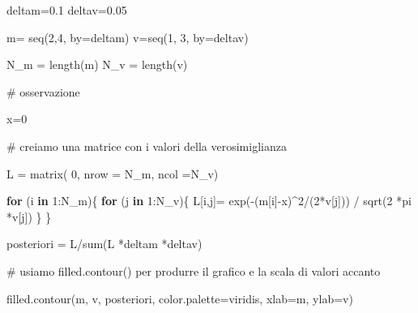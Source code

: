 \documentclass[
  italian,
  letterpaper,
]{book}
\newenvironment{Shaded}{\begin{snugshade}}{\end{snugshade}}
\newcommand{\AttributeTok}[1]{\textcolor[rgb]{0.40,0.45,0.13}{#1}}
\newcommand{\CommentTok}[1]{\textcolor[rgb]{0.37,0.37,0.37}{#1}}
\newcommand{\ControlFlowTok}[1]{\textcolor[rgb]{0.00,0.23,0.31}{\textbf{#1}}}
\newcommand{\DecValTok}[1]{\textcolor[rgb]{0.68,0.00,0.00}{#1}}
\newcommand{\FloatTok}[1]{\textcolor[rgb]{0.68,0.00,0.00}{#1}}
\newcommand{\FunctionTok}[1]{\textcolor[rgb]{0.28,0.35,0.67}{#1}}
\newcommand{\NormalTok}[1]{\textcolor[rgb]{0.00,0.23,0.31}{#1}}
\newcommand{\OtherTok}[1]{\textcolor[rgb]{0.00,0.23,0.31}{#1}}
\newcommand{\SpecialCharTok}[1]{\textcolor[rgb]{0.37,0.37,0.37}{#1}}
\newcommand{\StringTok}[1]{\textcolor[rgb]{0.13,0.47,0.30}{#1}}
\theoremstyle{definition}
\theoremstyle{remark}
\begin{document}
\begin{Shaded}
\begin{Highlighting}[]
\NormalTok{deltam}\OtherTok{=}\FloatTok{0.1}
\NormalTok{deltav}\OtherTok{=}\FloatTok{0.05}

\NormalTok{m}\OtherTok{=} \FunctionTok{seq}\NormalTok{(}\DecValTok{2}\NormalTok{,}\DecValTok{4}\NormalTok{, }\AttributeTok{by=}\NormalTok{deltam)}
\NormalTok{v}\OtherTok{=}\FunctionTok{seq}\NormalTok{(}\DecValTok{1}\NormalTok{, }\DecValTok{3}\NormalTok{, }\AttributeTok{by=}\NormalTok{deltav)}

\NormalTok{N\_m }\OtherTok{=} \FunctionTok{length}\NormalTok{(m)}
\NormalTok{N\_v }\OtherTok{=} \FunctionTok{length}\NormalTok{(v)}

\CommentTok{\# osservazione}

\NormalTok{x}\OtherTok{=}\DecValTok{0}


\CommentTok{\# creiamo una matrice con i valori della verosimiglianza}

\NormalTok{L }\OtherTok{=} \FunctionTok{matrix}\NormalTok{( }\DecValTok{0}\NormalTok{, }\AttributeTok{nrow =}\NormalTok{ N\_m, }\AttributeTok{ncol =}\NormalTok{N\_v)}

\ControlFlowTok{for}\NormalTok{ (i }\ControlFlowTok{in} \DecValTok{1}\SpecialCharTok{:}\NormalTok{N\_m)\{}
  \ControlFlowTok{for}\NormalTok{ (j }\ControlFlowTok{in} \DecValTok{1}\SpecialCharTok{:}\NormalTok{N\_v)\{}
\NormalTok{    L[i,j]}\OtherTok{=} \FunctionTok{exp}\NormalTok{(}\SpecialCharTok{{-}}\NormalTok{(m[i]}\SpecialCharTok{{-}}\NormalTok{x)}\SpecialCharTok{\^{}}\DecValTok{2}\SpecialCharTok{/}\NormalTok{(}\DecValTok{2}\SpecialCharTok{*}\NormalTok{v[j])) }\SpecialCharTok{/} \FunctionTok{sqrt}\NormalTok{(}\DecValTok{2} \SpecialCharTok{*}\NormalTok{pi }\SpecialCharTok{*}\NormalTok{v[j])}
\NormalTok{  \}}
\NormalTok{\}}

\NormalTok{posteriori }\OtherTok{=}\NormalTok{ L}\SpecialCharTok{/}\FunctionTok{sum}\NormalTok{(L }\SpecialCharTok{*}\NormalTok{deltam }\SpecialCharTok{*}\NormalTok{deltav)}


\CommentTok{\# usiamo filled.contour() per produrre il grafico e la scala di valori accanto}

\FunctionTok{filled.contour}\NormalTok{(m, v, posteriori, }\AttributeTok{color.palette=}\NormalTok{viridis, }\AttributeTok{xlab=}\StringTok{\textquotesingle{}m\textquotesingle{}}\NormalTok{, }\AttributeTok{ylab=}\StringTok{\textquotesingle{}v\textquotesingle{}}\NormalTok{)}
\end{Highlighting}
\end{Shaded}
\end{document}
